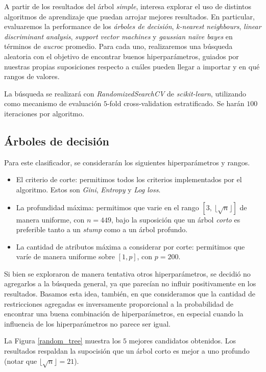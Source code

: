 A partir de los resultados del árbol \textit{simple}, interesa explorar el uso de distintos algoritmos de aprendizaje que puedan arrojar mejores resultados. En particular, evaluaremos la performance de los \textit{árboles de decisión}, \textit{k-nearest neighbours}, \textit{linear discriminant analysis}, \textit{support vector machines} y \textit{gaussian naïve bayes} en términos de \textit{aucroc} promedio. Para cada uno, realizaremos una búsqueda aleatoria con el objetivo de encontrar buenos hiperparámetros, guiados por nuestras propias suposiciones respecto a cuáles pueden llegar a importar y en qué rangos de valores.

La búsqueda se realizará con \textit{RandomizedSearchCV} de \textit{scikit-learn}, utilizando como mecanismo de evaluación $5$-fold cross-validation estratificado. Se harán $100$ iteraciones por algoritmo.

\subsection{Árboles de decisión}
Para este clasificador, se considerarán los siguientes hiperparámetros y rangos. 

\begin{itemize}
    \item El criterio de corte: permitimos todos los criterios implementados por el algoritmo. Estos son \textit{Gini}, \textit{Entropy} y \textit{Log loss}. 
    \item La profundidad máxima: permitimos que varie en el rango $[3,\ \lfloor\sqrt{n} \rfloor]$ de manera uniforme, con $n=449$, bajo la suposición que un árbol \textit{corto} es preferible tanto a un \textit{stump} como a un árbol profundo.
    \item La cantidad de atributos máxima a considerar por corte: permitimos que varíe de manera uniforme sobre $[1, p]$, con $p = 200$.
\end{itemize}

Si bien se exploraron de manera tentativa otros hiperparámetros, se decidió no agregarlos a la búsqueda general, ya que  parecían no influir positivamente en los resultados. Basamos esta idea, también, en que consideramos que la cantidad de restricciones agregadas es inversamente proporcional a la probabilidad de encontrar una buena combinación de hiperparámetros, en especial cuando la influencia de los hiperparámetros no parece ser igual. 

La Figura \ref{random_tree} muestra los $5$ mejores candidatos obtenidos. Los resultados respaldan la supocisión que un árbol corto es mejor a uno profundo (notar que $\lfloor\sqrt{n} \rfloor = 21$).

